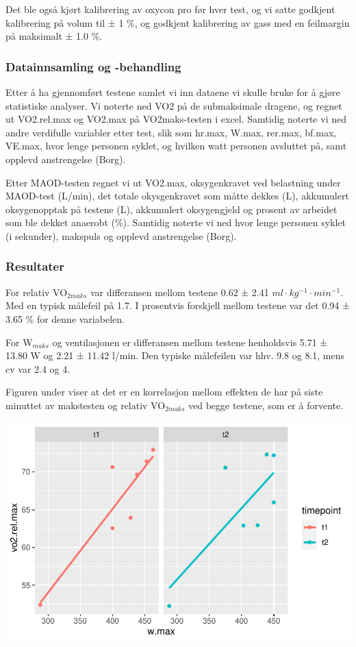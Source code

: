 \documentclass[
  letterpaper,
  DIV=11,
  numbers=noendperiod]{scrartcl}
\begin{document}
Det ble også kjørt kalibrering av oxycon pro før hver test, og vi satte
godkjent kalibrering på volum til ± 1 \%, og godkjent kalibrering av
gass med en feilmargin på maksimalt ± 1.0 \%.

\hypertarget{datainnsamling-og--behandling}{%
\subsubsection{Datainnsamling og
-behandling}\label{datainnsamling-og--behandling}}

Etter å ha gjennomført testene samlet vi inn dataene vi skulle bruke for
å gjøre statistiske analyser. Vi noterte ned VO2 på de submaksimale
dragene, og regnet ut VO2.rel.max og VO2.max på VO2maks-testen i excel.
Samtidig noterte vi ned andre verdifulle variabler etter test, slik som
hr.max, W.max, rer.max, bf.max, VE.max, hvor lenge personen syklet, og
hvilken watt personen avsluttet på, samt opplevd anstrengelse (Borg).

Etter MAOD-testen regnet vi ut VO2.max, oksygenkravet ved belastning
under MAOD-test (L/min), det totale okysgenkravet som måtte dekkes (L),
akkumulert oksygenopptak på testene (L), akkumulert oksygengjeld og
prosent av arbeidet som ble dekket anaerobt (\%). Samtidig noterte vi
ned hvor lenge personen syklet (i sekunder), makspuls og opplevd
anstrengelse (Borg).

\hypertarget{resultater}{%
\subsubsection{Resultater}\label{resultater}}

For relativ VO\(_{2maks}\) var differansen mellom testene 0.62 ± 2.41
\(ml·kg^{-1}·min^{-1}\). Med en typisk målefeil på 1.7. I prosentvis
forskjell mellom testene var det 0.94 ± 3.65 \% for denne variabelen.

For W\(_{maks}\) og ventilasjonen er differansen mellom testene
henholdsvis 5.71 ± 13.80 W og 2.21 ± 11.42 l/min. Den typiske målefeilen
var hhv. 9.8 og 8.1, mens cv var 2.4 og 4.

Figuren under viser at det er en korrelasjon mellom effekten de har på
siste minuttet av makstesten og relativ VO\(_{2maks}\) ved begge
testene, som er å forvente.

\includegraphics{Protokoll_files/figure-pdf/unnamed-chunk-5-1.pdf}
\end{document}
